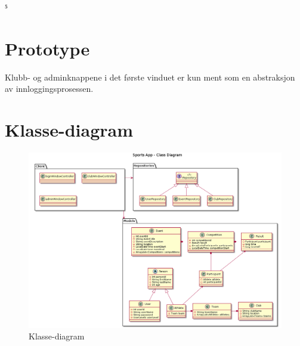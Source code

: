 ⁵\documentclass[norsk]{article}
\begin{document}
\section{Prototype}
Klubb- og adminknappene i det første vinduet er kun ment som en abstraksjon av innloggingsprosessen.

\section{Klasse-diagram}
\begin{figure}[H]
\centering
    \includegraphics[scale=0.3]{images/class-uml.png}
    \caption{Klasse-diagram}\label{fig:class-uml}
\end{figure}
\end{document}
